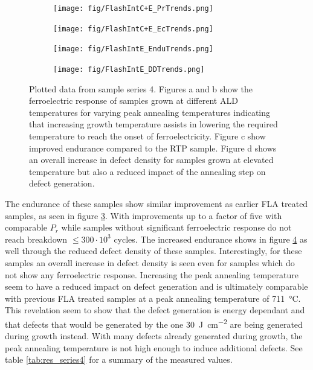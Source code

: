 \documentclass[11pt,twoside]{eitExjobb}
\begin{document}
\begin{figure}[htbp]
    \centering
    \begin{subfigure}{.4\linewidth}
        \texttt{[image: fig/FlashIntC+E\_PrTrends.png]}
        \caption{}\label{fig:res_IntEPr}
    \end{subfigure}
    \begin{subfigure}{.4\linewidth}
        \texttt{[image: fig/FlashIntC+E\_EcTrends.png]}
        \caption{}\label{fig:res_IntEEc}
    \end{subfigure}
    \begin{subfigure}{.4\linewidth}
        \texttt{[image: fig/FlashIntE\_EnduTrends.png]}
        \caption{}\label{fig:res_IntEEndu}
    \end{subfigure}
    \begin{subfigure}{.4\linewidth}
        \texttt{[image: fig/FlashIntE\_DDTrends.png]}
        \caption{}\label{fig:res_IntEDD}    
    \end{subfigure}
    \caption{Plotted data from sample series 4. Figures a and b show the
    ferroelectric response of samples grown at different ALD temperatures for
    varying peak annealing temperatures indicating that increasing growth
    temperature assists in lowering the required temperature to reach the onset of
    ferroelectricity. Figure c show improved endurance compared to the RTP
    sample. Figure d shows an overall increase in defect density for samples grown
    at elevated temperature but also a reduced impact of the annealing step on
    defect generation.}\label{fig:res_IntE}
\end{figure}

The endurance of these samples show similar improvement as earlier FLA treated
samples, as seen in figure \ref{fig:res_IntEEndu}. With improvements up to a
factor of five with comparable $P_r$ while samples without significant
ferroelectric response do not reach breakdown $\leq 300\cdot10^3$ cycles. The
increased endurance shows in figure \ref{fig:res_IntEDD} as well through the
reduced defect density of these samples. Interestingly, for these samples an
overall increase in defect density is seen even for samples which do not show
any ferroelectric response. Increasing the peak annealing temperature seem to
have a reduced impact on defect generation and is ultimately comparable with
previous FLA treated samples at a peak annealing temperature of
\SI{711}{\celsius}. This revelation seem to show that the defect generation is
energy dependant and that defects that would be generated by the one
\SI{30}{\joule\per\centi\meter\squared} are being generated during growth
instead. With many defects already generated during growth, the peak annealing
temperature is not high enough to induce additional defects. See table
\ref{tab:res_series4} for a summary of the measured values.
\end{document}
